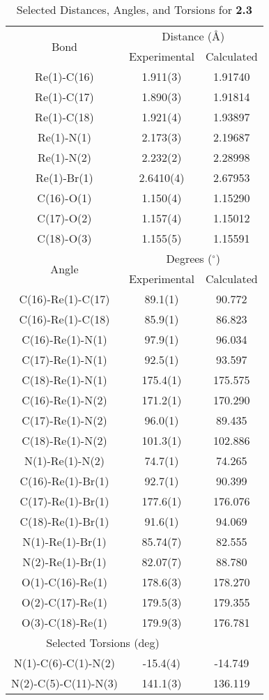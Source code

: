 \begin{table}[htbp]
  \caption{Selected Distances, Angles, and Torsions for \textbf{2.3}}
  \centering
    \begin{tabular}{ccc}
    \toprule
   \multirow{2}{*}{Bond} & \multicolumn{2}{c}{Distance (\r{A})} \\ \cline{2-3}
     & Experimental & Calculated \\ \midrule
    Re(1)-C(16) & 1.911(3) & 1.91740 \\
    Re(1)-C(17) & 1.890(3) & 1.91814 \\
    Re(1)-C(18) & 1.921(4) & 1.93897 \\
    Re(1)-N(1) & 2.173(3) & 2.19687 \\
    Re(1)-N(2) & 2.232(2) & 2.28998 \\
    Re(1)-Br(1) & 2.6410(4) & 2.67953 \\ 
    C(16)-O(1) & 1.150(4) & 1.15290 \\
    C(17)-O(2) & 1.157(4) & 1.15012 \\
    C(18)-O(3) & 1.155(5) & 1.15591 \\ \midrule
    \multirow{2}{*}{Angle} & \multicolumn{2}{c}{Degrees ($^\circ$)} \\ \cline{2-3}
     & Experimental & Calculated \\ \midrule
    C(16)-Re(1)-C(17) & 89.1(1) & 90.772 \\
    C(16)-Re(1)-C(18) & 85.9(1) & 86.823 \\
    C(16)-Re(1)-N(1) & 97.9(1) & 96.034 \\
    C(17)-Re(1)-N(1) & 92.5(1) & 93.597 \\
    C(18)-Re(1)-N(1) & 175.4(1) & 175.575 \\
    C(16)-Re(1)-N(2) & 171.2(1) & 170.290 \\
    C(17)-Re(1)-N(2) & 96.0(1) & 89.435 \\
    C(18)-Re(1)-N(2) & 101.3(1) & 102.886 \\
    N(1)-Re(1)-N(2) & 74.7(1) & 74.265 \\
    C(16)-Re(1)-Br(1) & 92.7(1) & 90.399 \\
    C(17)-Re(1)-Br(1) & 177.6(1) & 176.076 \\
    C(18)-Re(1)-Br(1) & 91.6(1) & 94.069 \\
    N(1)-Re(1)-Br(1) & 85.74(7) & 82.555 \\
    N(2)-Re(1)-Br(1) & 82.07(7) & 88.780 \\
    O(1)-C(16)-Re(1) & 178.6(3) & 178.270 \\
    O(2)-C(17)-Re(1) & 179.5(3) & 179.355 \\
    O(3)-C(18)-Re(1) & 179.9(3) & 176.781 \\ \midrule
    \multicolumn{2}{c}{Selected Torsions (deg)} \\ \midrule
    N(1)-C(6)-C(1)-N(2) & -15.4(4) & -14.749 \\
    N(2)-C(5)-C(11)-N(3) & 141.1(3) & 136.119 \\
    \bottomrule
    \end{tabular}%
  \label{tab.da3}%
\end{table}%


